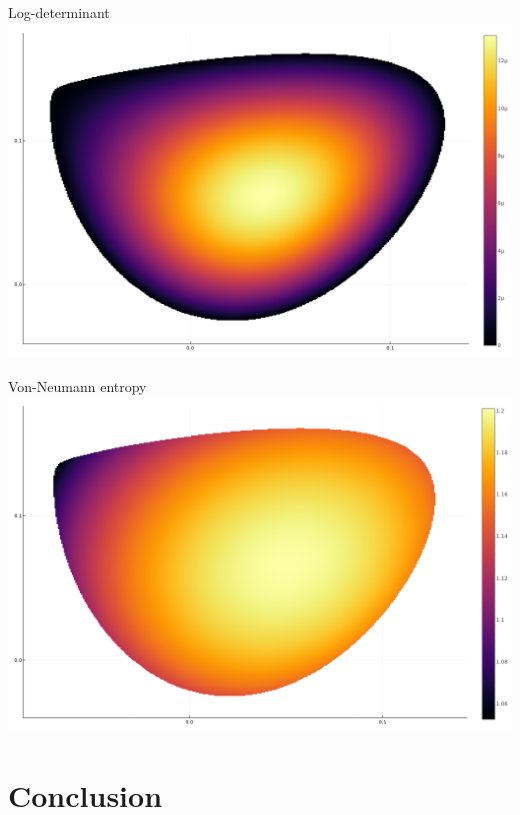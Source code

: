 \documentclass{beamer}
\begin{document}
\begin{frame}{Log-determinant}
  \includegraphics[width=\textwidth]{det5.png}
\end{frame}

\begin{frame}{Von-Neumann entropy}
  \includegraphics[width=\textwidth]{ent5.png}
\end{frame}




\section{Conclusion}
\end{document}
